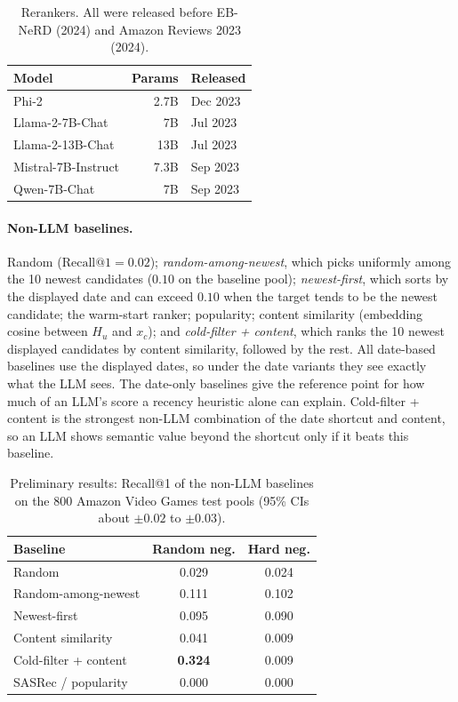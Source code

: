 \documentclass[11pt]{article}
\begin{document}
\begin{table}[t]
\centering
\small
\begin{tabularx}{\columnwidth}{@{}X r l@{}}
\toprule
\textbf{Model} & \textbf{Params} & \textbf{Released} \\
\midrule
Phi-2 & 2.7B & Dec 2023 \\
Llama-2-7B-Chat & 7B & Jul 2023 \\
Llama-2-13B-Chat & 13B & Jul 2023 \\
Mistral-7B-Instruct & 7.3B & Sep 2023 \\
Qwen-7B-Chat & 7B & Sep 2023 \\
\bottomrule
\end{tabularx}
\caption{Rerankers. All were released before EB-NeRD (2024) and Amazon Reviews 2023 (2024).}
\label{tab:models}
\end{table}

\paragraph{Non-LLM baselines.} Random ($\text{Recall@1} = 0.02$); \emph{random-among-newest}, which picks uniformly among the 10 newest candidates ($0.10$ on the baseline pool); \emph{newest-first}, which sorts by the displayed date and can exceed $0.10$ when the target tends to be the newest candidate; the warm-start ranker; popularity; content similarity (embedding cosine between $H_u$ and $x_c$); and \emph{cold-filter + content}, which ranks the 10 newest displayed candidates by content similarity, followed by the rest. All date-based baselines use the displayed dates, so under the date variants they see exactly what the LLM sees. The date-only baselines give the reference point for how much of an LLM's score a recency heuristic alone can explain. Cold-filter + content is the strongest non-LLM combination of the date shortcut and content, so an LLM shows semantic value beyond the shortcut only if it beats this baseline.

\begin{table}[t]
\centering
\small
\begin{tabularx}{\columnwidth}{@{}X c c@{}}
\toprule
\textbf{Baseline} & \textbf{Random neg.} & \textbf{Hard neg.} \\
\midrule
Random & 0.029 & 0.024 \\
Random-among-newest & 0.111 & 0.102 \\
Newest-first & 0.095 & 0.090 \\
Content similarity & 0.041 & 0.009 \\
Cold-filter + content & \textbf{0.324} & 0.009 \\
SASRec / popularity & 0.000 & 0.000 \\
\bottomrule
\end{tabularx}
\caption{Preliminary results: Recall@1 of the non-LLM baselines on the 800 Amazon Video Games test pools (95\% CIs about $\pm 0.02$ to $\pm 0.03$).}
\label{tab:prelim}
\end{table}
\end{document}
